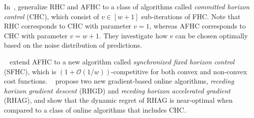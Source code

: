 In~\cite{Chen2016}, \citeauthor*{Chen2016} generalize RHC and AFHC to a class of algorithms called \emph{committed horizon control} (CHC), which consist of $v \in [w+1]$ sub-iterations of FHC. Note that RHC corresponds to CHC with parameter $v = 1$, whereas AFHC corresponds to CHC with parameter $v = w+1$. They investigate how $v$ can be chosen optimally based on the noise distribution of predictions.

\citeauthor*{Lin2019}~\cite{Lin2019} extend AFHC to a new algorithm called \emph{synchronized fixed horizon control} (SFHC), which is $(1 + \mathcal{O}(1/w))$-competitive for both convex and non-convex cost functions. \citeauthor*{Li2018}~\cite{Li2018} propose two new gradient-based online algorithms, \emph{receding horizon gradient descent} (RHGD) and \emph{receding horizon accelerated gradient} (RHAG), and show that the dynamic regret of RHAG is near-optimal when compared to a class of online algorithms that includes CHC.

